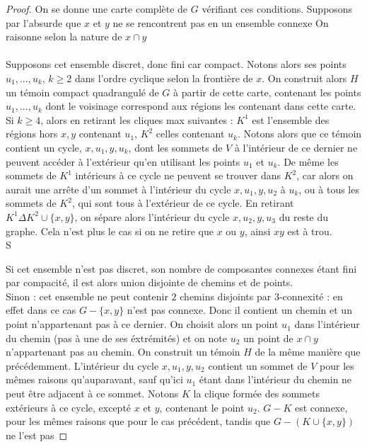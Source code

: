 \documentclass{scrartcl}
\begin{document}
\begin{flushleft}
\begin{proof}
    On se donne une carte complète de $G$ vérifiant ces conditions. Supposons par l'absurde que $x$ et $y$ ne se rencontrent pas en un ensemble connexe
    On raisonne selon la nature de $x \cap y$
    \\~\\
    Supposons cet ensemble discret, donc fini car compact. Notons alors ses points
    $u_1, ..., u_k$, $k \geq 2$ dans l'ordre cyclique selon la frontière de $x$. On construit alors $H$ un témoin compact quadrangulé de $G$
    à partir de cette carte, contenant les points $u_1, ..., u_k$ dont le voisinage correspond aux régions les contenant dans cette carte.\\
    Si $k \geq 4$, alors en retirant les cliques max suivantes : $K^1$ est l'ensemble des régions hors $x, y$ contenant $u_1$,
    $K^2$ celles contenant $u_k$. Notons alors que ce témoin contient un cycle, $x, u_1, y, u_k$, dont les sommets de $V$ à l'intérieur
    de ce dernier ne peuvent accéder à l'extérieur qu'en utilisant les points $u_1$ et $u_k$. De même les sommets de $K^1$ intérieurs
    à ce cycle ne peuvent se trouver dans $K^2$, car alors on aurait une arrête d'un sommet à l'intérieur du cycle $x, u_1, y, u_2$
    à $u_k$, ou à tous les sommets de $K^2$, qui sont tous à l'extérieur de ce cycle. En retirant $K^1 \Delta K^2 \cup \{x,y\}$, on sépare
    alors l'intérieur du cycle $x, u_2, y, u_3$ du reste du graphe. Cela n'est plus le cas si on ne retire que $x$ ou $y$, ainsi $xy$
    est à trou.\\
    S

    Si cet ensemble n'est pas discret, son nombre de composantes connexes étant fini par compacité, il est alors union disjointe de chemins
    et de points.\\
    Sinon : cet ensemble ne peut contenir $2$ chemins disjoints par $3$-connexité : en effet dans ce cas $G - \{x, y\}$ n'est pas connexe.
    Donc il contient un chemin et un point n'appartenant pas à ce dernier. On choisit alors un point $u_1$ dans l'intérieur du chemin (pas à une
    de ses éxtrémités) et on note $u_2$ un point de $x \cap y$ n'appartenant pas au chemin. On construit un témoin $H$ de la même manière que précédemment.
    L'intérieur du cycle $x, u_1, y, u_2$ contient un sommet de $V$ pour les mêmes raisons qu'auparavant, sauf qu'ici $u_1$ étant dans l'intérieur
    du chemin ne peut être adjacent à ce sommet. Notons $K$ la clique formée des sommets extérieurs à ce cycle, excepté $x$ et $y$, contenant le point $u_2$.
    $G - K$ est connexe, pour les mêmes raisons que pour le cas précédent, tandis que $G - (K \cup \{x, y\})$ ne l'est pas
\end{proof}


\end{flushleft}
\end{document}
